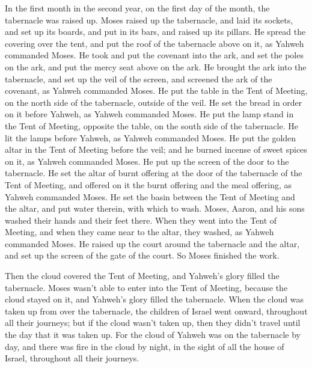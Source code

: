  In the first month in the second year, on the first day of
the month, the tabernacle was raised up.  Moses raised up
the tabernacle, and laid its sockets, and set up its boards, and put in
its bars, and raised up its pillars.  He spread the
covering over the tent, and put the roof of the tabernacle above on it,
as Yahweh commanded Moses.  He took and put the covenant
into the ark, and set the poles on the ark, and put the mercy seat above
on the ark.  He brought the ark into the tabernacle, and
set up the veil of the screen, and screened the ark of the covenant, as
Yahweh commanded Moses.  He put the table in the Tent of
Meeting, on the north side of the tabernacle, outside of the veil.
 He set the bread in order on it before Yahweh, as Yahweh
commanded Moses.  He put the lamp stand in the Tent of
Meeting, opposite the table, on the south side of the tabernacle.
 He lit the lamps before Yahweh, as Yahweh commanded Moses.
 He put the golden altar in the Tent of Meeting before the
veil;  and he burned incense of sweet spices on it, as
Yahweh commanded Moses.  He put up the screen of the door
to the tabernacle.  He set the altar of burnt offering at
the door of the tabernacle of the Tent of Meeting, and offered on it the
burnt offering and the meal offering, as Yahweh commanded Moses.
 He set the basin between the Tent of Meeting and the
altar, and put water therein, with which to wash.  Moses,
Aaron, and his sons washed their hands and their feet there.
 When they went into the Tent of Meeting, and when they
came near to the altar, they washed, as Yahweh commanded Moses.
 He raised up the court around the tabernacle and the
altar, and set up the screen of the gate of the court. So Moses finished
the work.

 Then the cloud covered the Tent of Meeting, and Yahweh's
glory filled the tabernacle.  Moses wasn't able to enter
into the Tent of Meeting, because the cloud stayed on it, and Yahweh's
glory filled the tabernacle.  When the cloud was taken up
from over the tabernacle, the children of Israel went onward, throughout
all their journeys;  but if the cloud wasn't taken up, then
they didn't travel until the day that it was taken up.  For
the cloud of Yahweh was on the tabernacle by day, and there was fire in
the cloud by night, in the sight of all the house of Israel, throughout
all their journeys.
